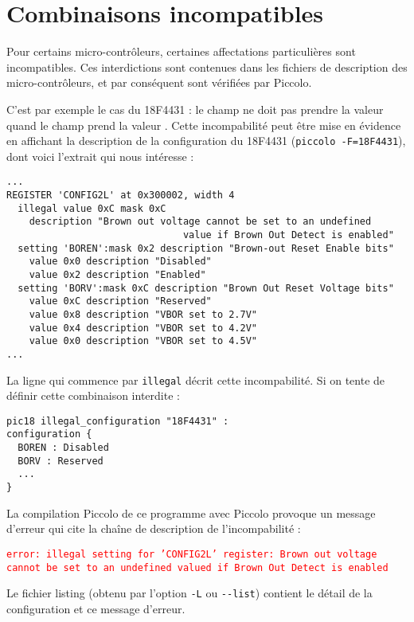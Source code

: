 \section{Combinaisons incompatibles}


Pour certains micro-contrôleurs, certaines affectations particulières sont incompatibles. Ces interdictions sont contenues dans les fichiers de description des micro-contrôleurs, et par conséquent sont vérifiées par Piccolo. 

C’est par exemple le cas du 18F4431 : le champ  ne doit pas prendre la valeur  quand le champ  prend la valeur . Cette incompabilité peut être mise en évidence en affichant la description de la configuration du 18F4431 (\texttt{piccolo -F=18F4431}), dont voici l'extrait qui nous intéresse :
\begin{lstlisting}[frame=l, language=assembleur]
...
REGISTER 'CONFIG2L' at 0x300002, width 4
  illegal value 0xC mask 0xC
    description "Brown out voltage cannot be set to an undefined 
                               value if Brown Out Detect is enabled"
  setting 'BOREN':mask 0x2 description "Brown-out Reset Enable bits"
    value 0x0 description "Disabled"
    value 0x2 description "Enabled"
  setting 'BORV':mask 0xC description "Brown Out Reset Voltage bits"
    value 0xC description "Reserved"
    value 0x8 description "VBOR set to 2.7V"
    value 0x4 description "VBOR set to 4.2V"
    value 0x0 description "VBOR set to 4.5V"
...
\end{lstlisting}


La ligne qui commence par \texttt{illegal} décrit cette incompabilité. Si on tente de définir cette combinaison interdite :
\begin{lstlisting}[language=piccolo]
pic18 illegal_configuration "18F4431" :
configuration {
  BOREN : Disabled
  BORV : Reserved
  ...
}
\end{lstlisting}

La compilation Piccolo de ce programme avec Piccolo provoque un message d’erreur qui cite la chaîne de description de l'incompabilité :


\textcolor{red}{\tt error: illegal setting for 'CONFIG2L' register: Brown out voltage cannot be set to an undefined valued if Brown Out Detect is enabled}

Le fichier listing (obtenu par l’option \texttt{-L} ou \texttt{-{}-list}) contient le détail de la configuration et ce message d’erreur.

